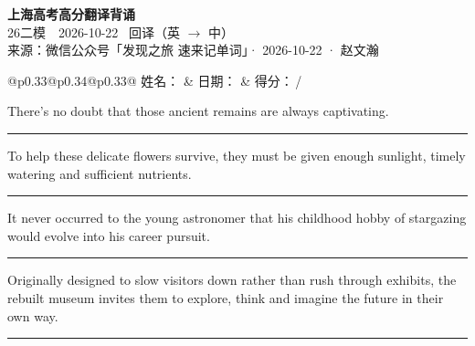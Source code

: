 \documentclass[11pt,a4paper]{article}
\newcommand{\num}[1]{\makebox[1.9em][r]{#1.}\hspace{0.3em}}
\newcommand{\wline}{\noindent\rule{\linewidth}{0.4pt}}
\begin{document}
\pagestyle{plain}
\begin{center}
{\LARGE\bfseries 上海高考高分翻译背诵 }\\[0.25em]
{\large 26二模　2026-10-22 \quad\ 回译（英 $\to$ 中）}\\[0.35em]
{\footnotesize 来源：微信公众号「发现之旅 速来记单词」· 2026-10-22 · 赵文瀚}
\end{center}

\vspace{0.4em}
\noindent\begin{tabular}{@{}p{0.33\textwidth}@{}p{0.34\textwidth}@{}p{0.33\textwidth}@{}}
姓名：\underline{\hspace{2.0cm}} & 日期：\underline{\hspace{2.0cm}} & 得分：\underline{\hspace{1.4cm}}\,/ \\
\end{tabular}

\vspace{0.5em}

\vspace{0.8em}
\num{1}There’s no doubt that those ancient remains are always captivating.

\vspace{0.25em}

\wline

\num{2}To help these delicate flowers survive, they must be given enough sunlight, timely watering and sufficient nutrients.

\vspace{0.25em}

\wline

\num{3}It never occurred to the young astronomer that his childhood hobby of stargazing would evolve into his career pursuit.

\vspace{0.25em}

\wline

\num{4}Originally designed to slow visitors down rather than rush through exhibits, the rebuilt museum invites them to explore, think and imagine the future in their own way.

\vspace{0.25em}

\wline
\end{document}
